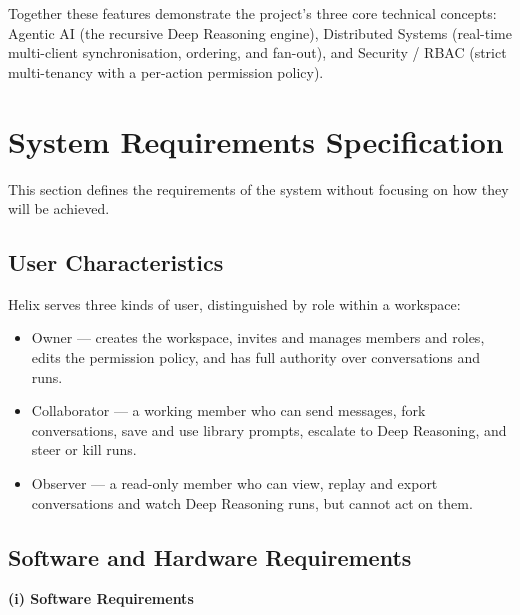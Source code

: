 \documentclass[12pt,a4paper]{report}
\begin{document}
Together these features demonstrate the project's three core technical concepts: Agentic AI (the recursive Deep Reasoning engine), Distributed Systems (real-time multi-client synchronisation, ordering, and fan-out), and Security / RBAC (strict multi-tenancy with a per-action permission policy).

\section{System Requirements Specification}
This section defines the requirements of the system without focusing on how they will be achieved.

\subsection{User Characteristics}
Helix serves three kinds of user, distinguished by role within a workspace:

\begin{itemize}
  \item Owner --- creates the workspace, invites and manages members and roles, edits the permission policy, and has full authority over conversations and runs.
  \item Collaborator --- a working member who can send messages, fork conversations, save and use library prompts, escalate to Deep Reasoning, and steer or kill runs.
  \item Observer --- a read-only member who can view, replay and export conversations and watch Deep Reasoning runs, but cannot act on them.
\end{itemize}

\subsection{Software and Hardware Requirements}
\noindent\textbf{(i) Software Requirements}
\end{document}
